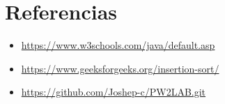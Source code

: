 \documentclass{article}
\begin{document}
	\clearpage
	
	
\clearpage

\section{Referencias}
\begin{itemize}			
	\item \url{https://www.w3schools.com/java/default.asp}
	\item \url{https://www.geeksforgeeks.org/insertion-sort/}
	\item \url{https://github.com/Joshep-c/PW2LAB.git}
\end{itemize}	
	
%
%
%
			
\end{document}
